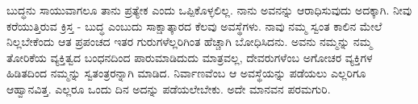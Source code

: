 \newpage

ಬುದ್ಧನು ಸಾಯುವಾಗಲೂ ತಾನು ಪ್ರತ್ಯೇಕ ಎಂದು ಒಪ್ಪಿಕೊಳ್ಳಲಿಲ್ಲ. ನಾನು ಅವನನ್ನು ಆರಾಧಿಸುವುದು ಅದಕ್ಕಾಗಿ. ನೀವು ಕರೆಯುತ್ತಿರುವ ಕ್ರಿಸ್ತ - ಬುದ್ಧ ಎಂಬುದು ಸಾಕ್ಷಾತ್ಕಾರದ ಕೆಲವು ಅವಸ್ಥೆಗಳು. ನಾವು ನಮ್ಮ ಸ್ವಂತ ಕಾಲಿನ ಮೇಲೆ ನಿಲ್ಲಬೇಕೆಂದು ಆತ ಪ್ರಪಂಚದ ಇತರ ಗುರುಗಳೆಲ್ಲರಿಗಿಂತ ಹೆಚ್ಚಾಗಿ ಬೋಧಿಸಿದನು. ಅವನು ನಮ್ಮನ್ನು ನಮ್ಮ ತೋರಿಕೆಯ ವ್ಯಕ್ತಿತ್ವದ ಬಂಧನದಿಂದ ಪಾರುಮಾಡಿದುದು ಮಾತ್ರವಲ್ಲ, ದೇವರುಗಳೆಂಬ ಅಗೋಚರ ವ್ಯಕ್ತಿಗಳ ಹಿಡಿತದಿಂದ ನಮ್ಮನ್ನು ಸ್ವತಂತ್ರರನ್ನಾಗಿ ಮಾಡಿದ. ನಿರ್ವಾಣವೆಂಬ ಆ ಅವಸ್ಥೆಯನ್ನು ಪಡೆಯಲು ಎಲ್ಲರಿಗೂ ಆಹ್ವಾನವಿತ್ತ. ಎಲ್ಲರೂ ಒಂದು ದಿನ ಅದನ್ನು ಪಡೆಯಲೇಬೇಕು. ಅದೇ ಮಾನವನ ಪರಮಗುರಿ.

